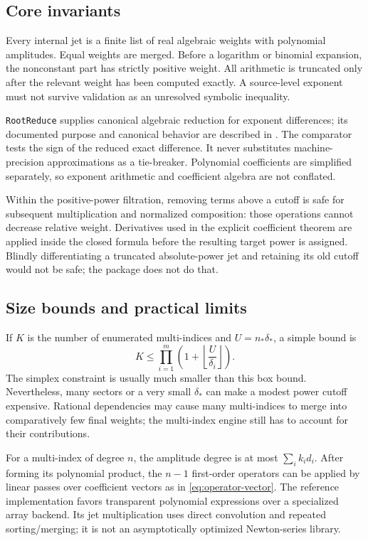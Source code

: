 \documentclass[11pt,a4paper]{article}
\numberwithin{equation}{section}
\theoremstyle{definition}\newtheorem{definition}[theorem]{Definition}
\theoremstyle{remark}\newtheorem{remark}[theorem]{Remark}
\newcommand{\code}[1]{\texttt{#1}}
\begin{document}
\subsection{Core invariants}

Every internal jet is a finite list of real algebraic weights with
polynomial amplitudes. Equal weights are merged. Before a logarithm or
binomial expansion, the nonconstant part has strictly positive weight.
All arithmetic is truncated only after the relevant weight has been
computed exactly. A source-level exponent must not survive validation as
an unresolved symbolic inequality.

\code{RootReduce} supplies canonical algebraic reduction for exponent
differences; its documented purpose and canonical behavior are described
in \cite{wl-rootreduce}. The comparator tests the sign of the reduced
exact difference. It never substitutes machine-precision approximations
as a tie-breaker. Polynomial coefficients are simplified separately, so
exponent arithmetic and coefficient algebra are not conflated.

Within the positive-power filtration, removing terms above a cutoff is
safe for subsequent multiplication and normalized composition: those
operations cannot decrease relative weight. Derivatives used in the
explicit coefficient theorem are applied inside the closed formula
before the resulting target power is assigned. Blindly differentiating a
truncated absolute-power jet and retaining its old cutoff would not be
safe; the package does not do that.

\subsection{Size bounds and practical limits}

If $K$ is the number of enumerated multi-indices and
$U=n_*\delta_*$, a simple bound is
\[
 K\le\prod_{i=1}^m\left(1+\left\lfloor\frac U{\delta_i}\right\rfloor\right).
\]
The simplex constraint is usually much smaller than this box bound.
Nevertheless, many sectors or a very small $\delta_*$ can make a modest
power cutoff expensive. Rational dependencies may cause many
multi-indices to merge into comparatively few final weights; the
multi-index engine still has to account for their contributions.

For a multi-index of degree $n$, the amplitude degree is at most
$\sum_i k_i d_i$. After forming its polynomial product, the $n-1$
first-order operators can be applied by linear passes over coefficient
vectors as in \cref{eq:operator-vector}. The reference implementation
favors transparent polynomial expressions over a specialized array
backend. Its jet multiplication uses direct convolution and repeated
sorting/merging; it is not an asymptotically optimized Newton-series
library.
\end{document}
